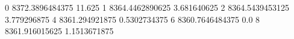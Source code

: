 0 8372.3896484375 11.625
1 8364.4462890625 3.681640625
2 8364.5439453125 3.779296875
4 8361.294921875 0.5302734375
6 8360.7646484375 0.0
8 8361.916015625 1.1513671875
